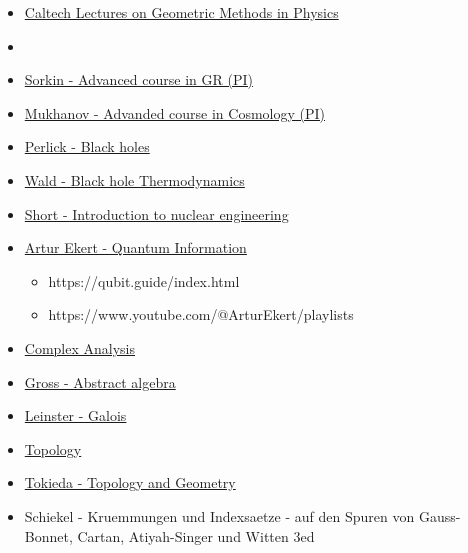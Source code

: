 \documentclass[10pt,a4paper]{book}
\theoremstyle{definition}
\begin{document}
\begin{itemize}
\item \href{https://www.youtube.com/playlist?list=PLAMDKMENB2xBOucbrZWja2Rs-SdqH7KIX}{Caltech Lectures on Geometric Methods in Physics}
\item \href{}{}

\item \href{https://www.youtube.com/watch?v=5IDHkKwXK4Y&list=PLaNkJORnlhZlAeFDKvWuoyqBBLPZ0F-3X}{Sorkin - Advanced course in GR (PI)}
\item \href{https://www.youtube.com/watch?v=IPxnAw91bMM&list=PLaNkJORnlhZkrH4w1AXqx4c4KNjJgh2rB}{Mukhanov - Advanded course in Cosmology (PI)}

\item \href{https://www.youtube.com/watch?v=3JhwuqEdyXM&list=PLaNkJORnlhZl6XY824eq9D2x6JoLwwpyr}{Perlick - Black holes}
\item \href{https://www.youtube.com/watch?v=Ssmr057FLEE}{Wald - Black hole Thermodynamics}

\item \href{https://ocw.mit.edu/courses/22-01-introduction-to-nuclear-engineering-and-ionizing-radiation-fall-2016/video_galleries/lecture-videos/}{Short - Introduction to nuclear engineering}

\item \href{https://www.arturekert.org/iqis}{Artur Ekert - Quantum Information}
\begin{itemize}
\item https://qubit.guide/index.html
\item https://www.youtube.com/@ArturEkert/playlists
\end{itemize}
\item \href{https://www.youtube.com/@StokesLine}{Complex Analysis}
\item \href{https://www.youtube.com/watch?v=VdLhQs_y_E8&list=PLelIK3uylPMGzHBuR3hLMHrYfMqWWsmx5}{Gross - Abstract algebra}
\item \href{https://www.maths.ed.ac.uk/~tl/gt/gt.pdf}{Leinster - Galois}
\item \href{http://www.math.toronto.edu/ivan/mat327/?resources}{Topology}
\item \href{https://www.youtube.com/watch?v=SXHHvoaSctc&list=PLTBqohhFNBE_09L0i-lf3fYXF5woAbrzJ}{Tokieda - Topology and Geometry}
\item Schiekel - Kruemmungen und Indexsaetze - auf den Spuren von Gauss-Bonnet, Cartan, Atiyah-Singer und Witten 3ed

\end{itemize}
\end{document}
